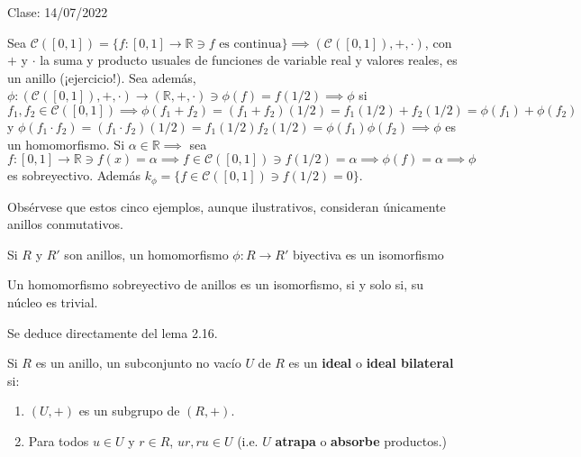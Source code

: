 

Clase: 14/07/2022

\begin{ejemplo}
    Sea $\mathcal{C}([0,1])=\{f:[0,1]\to \mathbb{R}\ni f \text{ es continua}\}\implies \left(\mathcal{C}([0,1]),+,\cdot\right)$, con $+$ y $\cdot$ la suma y producto usuales de funciones de variable real y valores reales, es un anillo (¡ejercicio!). Sea además, $\phi:(\mathcal{C}([0,1]),+,\cdot) \to (\mathbb{R},+,\cdot)\ni \phi(f)=f(1/2)\implies \phi$ si $f_1,f_2\in \mathcal{C}([0,1])\implies \phi(f_1+f_2)=(f_1+f_2)(1/2)=f_1(1/2)+f_2(1/2)=\phi(f_1)+\phi(f_2)$ y $\phi(f_1\cdot f_2)=(f_1\cdot f_2)(1/2)=f_1(1/2)f_2(1/2)=\phi(f_1)\phi(f_2)\implies \phi$ es un homomorfismo. Si $\alpha\in\mathbb{R}\implies$ sea $f:[0,1]\to \mathbb{R}\ni f(x)=\alpha \implies f\in \mathcal{C}([0,1])\ni f(1/2)=\alpha\implies \phi(f)=\alpha\implies \phi$ es sobreyectivo. Además $k_\phi=\{f\in \mathcal{C}([0,1])\ni f(1/2)=0\}$.
\end{ejemplo}


\begin{nota}
    Obsérvese que estos cinco ejemplos, aunque ilustrativos, consideran únicamente anillos conmutativos. 
\end{nota}

\begin{definicion}
    Si $R$ y $R'$ son anillos, un homomorfismo $\phi: R\to R'$ biyectiva es un isomorfismo 
\end{definicion}

\begin{lema}[3.5]
    Un homomorfismo sobreyectivo de anillos es un isomorfismo, si y solo si, su núcleo es trivial. 
    \begin{dem}
        Se deduce directamente del lema 2.16.
    \end{dem}
\end{lema}

\begin{definicion}
    Si $R$ es un anillo, un subconjunto no vacío $U$ de $R$ es un \textbf{ideal} o \textbf{ideal bilateral} si: 
    \begin{enumerate}
        \item $(U,+)$ es un subgrupo de $(R,+)$.
        \item Para todos $u\in U$ y $r\in R$, $ur,ru\in U$ (i.e. $U$ \textbf{atrapa} o \textbf{absorbe} productos.)
    \end{enumerate}
\end{definicion}

